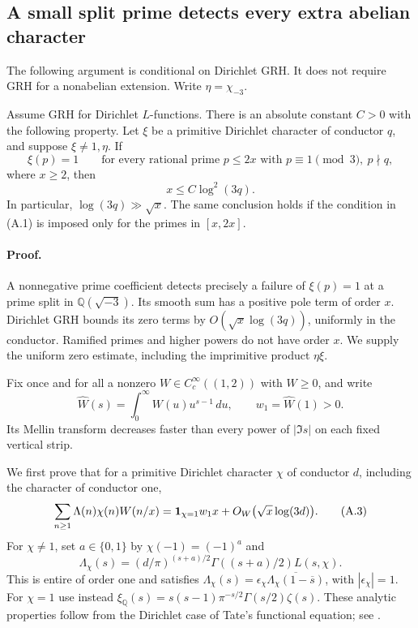 \subsection{A small split prime detects every extra abelian character}
\label{sec:abelian-character-detector}

The following argument is conditional on Dirichlet GRH. It does not require GRH for a nonabelian extension.
Write $\eta=\chi_{-3}$.

\begin{proposition}\label{prop:abelian-character-detector}
Assume GRH for Dirichlet $L$-functions.
There is an absolute constant $C>0$ with the following property.
Let $\xi$ be a primitive Dirichlet character of conductor $q$,
and suppose $\xi\ne1,\eta$. If
\[
 \xi(p)=1
 \qquad\text{for every rational prime }p\le 2x
       \text{ with }p\equiv1\pmod3,\ p\nmid q,
                                                        \tag{A.1}
\]
where $x\ge2$, then
\[
                         x\le C\log^2(3q).              \tag{A.2}
\]
In particular, $\log(3q)\gg\sqrt{x}$.
The same conclusion holds if the condition in (A.1) is imposed
only for the primes in $[x,2x]$.
\end{proposition}

\paragraph{Proof.}
A nonnegative prime coefficient detects precisely a failure of
$\xi(p)=1$ at a prime split in $\mathbb Q(\sqrt{-3})$.
Its smooth sum has a positive pole term of order $x$.
Dirichlet GRH bounds its zero terms by
$O(\sqrt{x}\log(3q))$, uniformly in the conductor.
Ramified primes and higher powers do not have order $x$.
We supply the uniform zero estimate, including the imprimitive
product $\eta\xi$.

Fix once and for all a nonzero $W\in C_c^\infty((1,2))$ with
$W\ge0$, and write
\[
 \widehat W(s)=\int_0^\infty W(u)u^{s-1}\,du,\qquad
                         w_1=\widehat W(1)>0.
\]
Its Mellin transform decreases faster than every power of $|\Im s|$
on each fixed vertical strip.

We first prove that for a primitive Dirichlet character $\chi$
of conductor $d$, including the character of conductor one,
\[
 \sum_{n\ge1}\Lambda(n)\chi(n)W(n/x)
 ={\bf1}_{\chi=1}w_1x+
             O_W\bigl(\sqrt{x}\log(3d)\bigr).
                                                        \tag{A.3}
\]
For $\chi\ne1$, set $a\in\{0,1\}$ by $\chi(-1)=(-1)^a$ and
\[
 \Lambda_\chi(s)=
 (d/\pi)^{(s+a)/2}\Gamma((s+a)/2)L(s,\chi).
\]
This is entire of order one and satisfies
$\Lambda_\chi(s)=\epsilon_\chi
 \overline{\Lambda_\chi(1-\overline s)}$, with
$|\epsilon_\chi|=1$.
For $\chi=1$ use instead
$\xi_{\mathbb Q}(s)=s(s-1)\pi^{-s/2}\Gamma(s/2)\zeta(s)$.
These analytic properties follow from the Dirichlet case of
Tate's functional equation; see \citet[Theorems~5.16 and 5.22(b),(c), pp.~34--39]{Poonen2015}.

